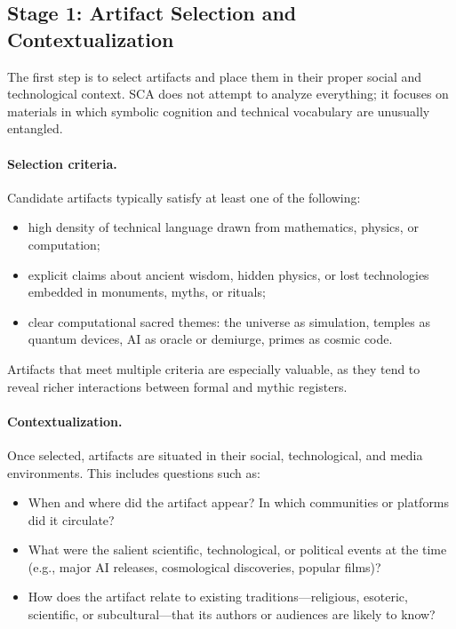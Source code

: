 \documentclass[12]{amsart}
\theoremstyle{plain}
\begin{document}
\subsection{Stage 1: Artifact Selection and Contextualization}

The first step is to select artifacts and place them in their proper social and technological context. SCA does not attempt to analyze everything; it focuses on materials in which symbolic cognition and technical vocabulary are unusually entangled.

\paragraph{Selection criteria.} Candidate artifacts typically satisfy at least one of the following:

\begin{itemize}
  \item high density of technical language drawn from mathematics, physics, or computation;
  \item explicit claims about ancient wisdom, hidden physics, or lost technologies embedded in monuments, myths, or rituals;
  \item clear computational sacred themes: the universe as simulation, temples as quantum devices, AI as oracle or demiurge, primes as cosmic code.
\end{itemize}

Artifacts that meet multiple criteria are especially valuable, as they tend to reveal richer interactions between formal and mythic registers.

\paragraph{Contextualization.} Once selected, artifacts are situated in their social, technological, and media environments. This includes questions such as:

\begin{itemize}
  \item When and where did the artifact appear? In which communities or platforms did it circulate?
  \item What were the salient scientific, technological, or political events at the time (e.g., major AI releases, cosmological discoveries, popular films)?
  \item How does the artifact relate to existing traditions---religious, esoteric, scientific, or subcultural---that its authors or audiences are likely to know?
\end{itemize}
\end{document}
